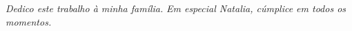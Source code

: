 \documentclass[monografia.tex]{subfiles}
\begin{document}
	\vspace*{\fill}
     \raggedleft
    \textit{Dedico este trabalho à minha família.}
    \textit{Em especial Natalia, cúmplice em todos os momentos.}
	
\end{document}
